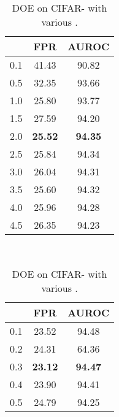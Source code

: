 \documentclass{article} \usepackage{iclr2022_conference,times}
\begin{document}
\begin{table}[t]
\centering
\parbox{.23\linewidth}{
\centering
\scriptsize
\caption{DOE on CIFAR- with various .} \label{tab: hyper_lamb}
\vspace{5pt}
{
\begin{tabular}{c|cc}
\toprule[1.5pt]
                  & FPR                & AUROC                  \\
\midrule[0.6pt]
0.1               & 41.43                  & 90.82                  \\
0.5               & 32.35                  & 93.66                  \\
1.0               & 25.80                  & 93.77                  \\
1.5               & 27.59                  & 94.20                  \\
\cellcolor{greyL}2.0               & \cellcolor{greyL}\textbf{25.52}                  & \cellcolor{greyL}\textbf{94.35}                  \\
2.5               & 25.84                  & 94.34                  \\
3.0               & 26.04                  & 94.31                  \\
3.5               & 25.60                  & 94.32                  \\
4.0               & 25.96                  & 94.28                  \\
4.5               & 26.35                  & 94.23                  \\
\bottomrule[1.5pt]      
\end{tabular}
}}~~
\parbox{.23\linewidth}{
\centering
\scriptsize
\caption{DOE on CIFAR- with various .} \label{tab: hyper_beta}
\vspace{5pt}
{
\begin{tabular}{c|cc}
\toprule[1.5pt]
                  & FPR                & AUROC                  \\
\midrule[0.6pt]
0.1               & 23.52                  & 94.48                  \\
0.2               & 24.31                  & 64.36                  \\
\cellcolor{greyL}0.3               & \cellcolor{greyL}\textbf{23.12}                  & \cellcolor{greyL}\textbf{94.47}                  \\
0.4               & 23.90                  & 94.41                  \\
0.5               & 24.79                  & 94.25                  \\

\end{tabular}}}
\end{table}
\end{document}
